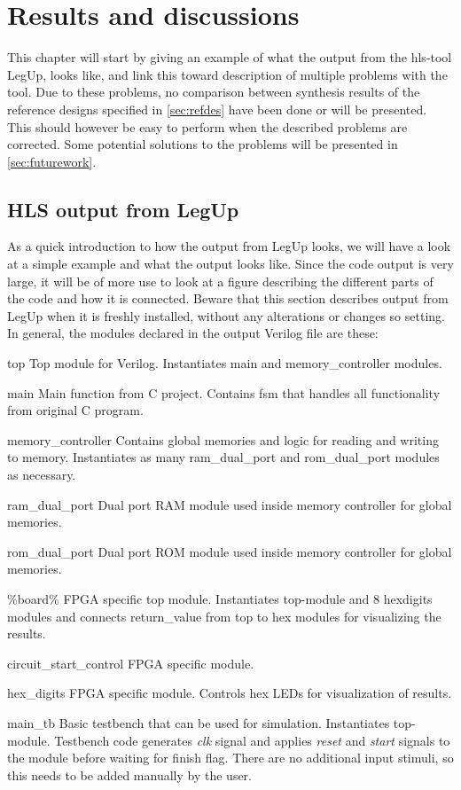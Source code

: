 \chapter{Results and discussions}
\label{chp:resdisc}
This chapter will start by giving an example of what the output from the \gls{hls}-tool LegUp, looks like, and link this toward description of multiple problems with the tool. Due to these problems, no comparison between synthesis results of the reference designs specified in \cref{sec:refdes} have been done or will be presented. This should however be easy to perform when the described problems are corrected. Some potential solutions to the problems will be presented in \cref{sec:futurework}.
\section{HLS output from LegUp}
As a quick introduction to how the output from LegUp looks, we will have a look at a simple example and what the output looks like. Since the code output is very large, it will be of more use to look at a figure describing the different parts of the code and how it is connected. Beware that this section describes output from LegUp when it is freshly installed, without any alterations or changes so setting. In general, the modules declared in the output Verilog file are these:
\begin{compactdesc}
    \item[top]Top module for Verilog. Instantiates main and memory\_controller modules.
    \item[main]Main function from C project. Contains \gls{fsm} that handles all functionality from original C program.
    \item[memory\_controller]Contains global memories and logic for reading and writing to memory. Instantiates as many ram\_dual\_port and rom\_dual\_port modules as necessary.
    \item[ram\_dual\_port] Dual port RAM module used inside memory controller for global memories.
    \item[rom\_dual\_port] Dual port ROM module used inside memory controller for global memories.
    \item[\%board\%]FPGA specific top module. Instantiates top-module and 8 hex{\textunderscore}digits modules and connects return\_value from top to hex modules for visualizing the results.
    \item[circuit\_start\_control]FPGA specific module. 
    \item[hex\_digits]FPGA specific module. Controls hex LEDs for visualization of results.
    \item[main\_tb]Basic testbench that can be used for simulation. Instantiates top-module. Testbench code generates \textit{clk} signal and applies \textit{reset} and \textit{start} signals to the module before waiting for finish flag. There are no additional input stimuli, so this needs to be added manually by the user.
\end{compactdesc}

